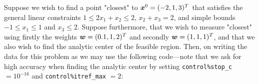 \documentclass{galahad}
\begin{document}
\galexample
Suppose we wish to find a point "closest" to
${\bm{x}}^{0}  =  ( -2, 1, 3 )^{T}$
that satisfies the general linear constraints
$1 \leq  2 x_{1}  +  x_{2}  \leq  2$, 
$x_{2}  +  x_{3}  =  2$, and simple bounds
$-1  \leq  x_{1}  \leq  1$ and $x_{3}  \leq  2$.
Suppose furthermore, that we wish to measure "closest" using
firstly the weights ${\bm{w}}  =  ( 0.1, 1, 2 )^{T}$
and secondly ${\bm{w}}  =  ( 1, 1, 1 )^{T}$, and that we also
wish to find the analytic center of the feasible region.
Then, on writing the data for this problem as
we may use the following code---note that we ask for high accuracy
when finding the analytic center by setting
{\tt control\%stop\_c} $= 10^{-16}$ and {\tt control\%itref\_max} $= 2$:
\end{document}
